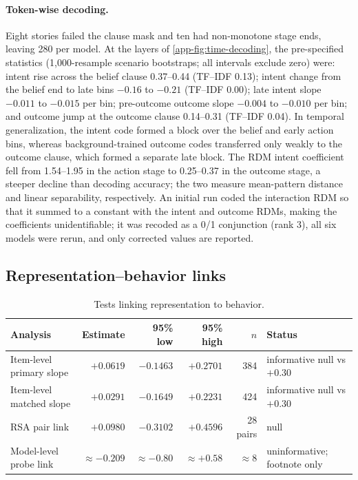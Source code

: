 \paragraph{Token-wise decoding.}
Eight stories failed the clause mask and ten had non-monotone stage ends, leaving 280 per model.
At the layers of \cref{app-fig:time-decoding}, the pre-specified statistics (1{,}000-resample scenario bootstraps; all intervals exclude zero) were: intent rise across the belief clause 0.37--0.44 (TF--IDF 0.13); intent change from the belief end to late bins $-0.16$ to $-0.21$ (TF--IDF 0.00); late intent slope $-0.011$ to $-0.015$ per bin; pre-outcome outcome slope $-0.004$ to $-0.010$ per bin; and outcome jump at the outcome clause 0.14--0.31 (TF--IDF 0.04).
In temporal generalization, the intent code formed a block over the belief and early action bins, whereas background-trained outcome codes transferred only weakly to the outcome clause, which formed a separate late block.
The RDM intent coefficient fell from 1.54--1.95 in the action stage to 0.25--0.37 in the outcome stage, a steeper decline than decoding accuracy; the two measure mean-pattern distance and linear separability, respectively.
An initial run coded the interaction RDM so that it summed to a constant with the intent and outcome RDMs, making the coefficients unidentifiable; it was recoded as a 0/1 conjunction (rank 3), all six models were rerun, and only corrected values are reported.

\subsection{Representation--behavior links}

\begin{table}[h]
\centering
\footnotesize
\caption{Tests linking representation to behavior.}
\label{tab:representation-links}
\begin{tabularx}{\textwidth}{@{}XrrrrX@{}}
\toprule
Analysis & Estimate & 95\% low & 95\% high & $n$ & Status \\
\midrule
Item-level primary slope & $+0.0619$ & $-0.1463$ & $+0.2701$ & 384 & informative null vs $+0.30$ \\
Item-level matched slope & $+0.0291$ & $-0.1649$ & $+0.2231$ & 424 & informative null vs $+0.30$ \\
RSA pair link & $+0.0980$ & $-0.3102$ & $+0.4596$ & 28 pairs & null \\
Model-level probe link & $\approx-0.209$ & $\approx-0.80$ & $\approx+0.58$ & $\approx8$ & uninformative; footnote only \\
\bottomrule
\end{tabularx}
\end{table}

